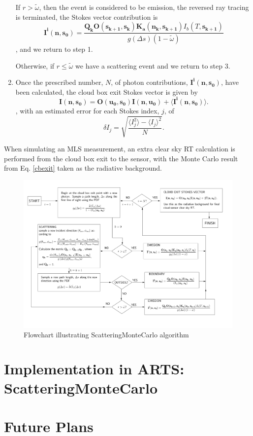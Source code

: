 \begin{enumerate}
If $r>\tilde{\omega}$, then the event is considered to be emission,
the reversed ray tracing is terminated, the Stokes vector contribution is
\begin{equation}
\mathbf{I^i(n,s_0)}=\frac{\mathbf{Q_k O(s_{k+1},s_k)}
  \mathbf{K_a(n_k,s_{k+1})} I_b(T,\mathbf{s_{k+1}})}
  {g\left(\Delta s\right)\left(1-\tilde{\omega}\right)}
\label{Iemission3}
\end{equation}
, and we return to step 1.

Otherwise, if $r\le\tilde{\omega}$
we have a scattering event and we return to step 3.
\item
Once the prescribed number, $N$,  of photon contributions,
$\mathbf{I^i(n,s_0)}$, have been calculated, the cloud box exit Stokes
vector is given by
\begin{equation}
\mathbf{I(n,s_0)}=\mathbf{O(u_0,s_0)I(n,u_0)}+\langle\mathbf{I^i(n,s_0)}\rangle.
\label{cbexit}
\end{equation}
, with an estimated error for each Stokes index, $j$,  of
\begin{equation}
\delta I_j=\sqrt{\frac{\langle I_j^2\rangle-\langle I_j\rangle^2}{N}}.
\label{error}
\end{equation}
\end{enumerate}
When simulating an MLS measurement, an extra clear sky RT calculation
is performed from the cloud box exit to the sensor, with the Monte
Carlo result from Eq. \ref{cbexit} taken as the radiative background.

\begin{figure}[h]
\begin{center}
\includegraphics[height=0.9\vsize]{flowchart}
\caption{Flowchart illustrating ScatteringMonteCarlo algorithm}
\end{center}
\label{fig:montecarlo:flowchart}
\end{figure}
\section{Implementation in ARTS: ScatteringMonteCarlo}
 \label{sec:montecarlo:implementation}

\section{Future Plans}
 \label{sec:montecarlo:plans}
 

